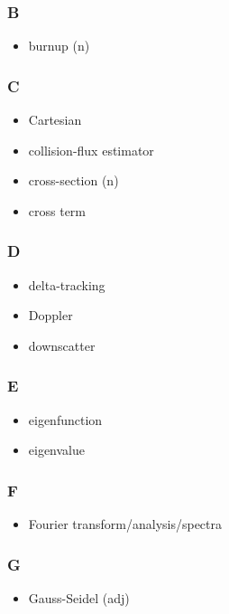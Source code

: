 \documentclass[10pt, letter]{article}
\begin{document}
\begin{multicols}{2}
\subsubsection*{B}
\begin{itemize}
\item burnup (n)
\end{itemize}


\subsubsection*{C}
\begin{itemize}
\item Cartesian
\item collision-flux estimator
\item cross-section (n)
\item cross term
\end{itemize}

\subsubsection*{D}
\begin{itemize}
\item delta-tracking
\item Doppler
\item downscatter
\end{itemize}


\subsubsection*{E}
\begin{itemize}
\item eigenfunction
\item eigenvalue
\end{itemize}
\subsubsection*{F}
\begin{itemize}
\item Fourier transform/analysis/spectra
\end{itemize}
\subsubsection*{G}
\begin{itemize}
\item Gauss-Seidel (adj)
\end{itemize}

\end{multicols}
\end{document}
